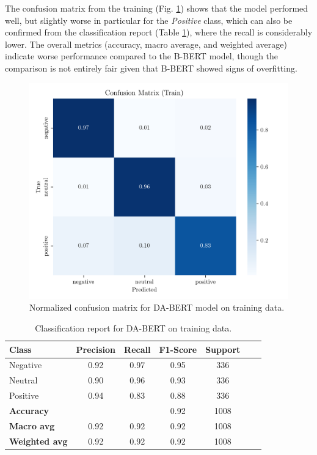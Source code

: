 \documentclass[conference]{IEEEtran}
\begin{document}
The confusion matrix from the training (Fig. \ref{fig:dataaugmented_bert_confusion_matrix_Train}) shows that the model performed well, but slightly worse in particular for the \textit{Positive} class, which can also be confirmed from the classification report (Table \ref{cr_augmbert_train}), where the recall is considerably lower. The overall metrics (accuracy, macro average, and weighted average) indicate worse performance compared to the B-BERT model, though the comparison is not entirely fair given that B-BERT showed signs of overfitting.

\begin{figure}[H]
    \centering
    \includegraphics[width=1\linewidth]{assets/dataaugmented_bert_confusion_matrix_Train.png}
    \caption{Normalized confusion matrix for DA-BERT model on training data.}
    \label{fig:dataaugmented_bert_confusion_matrix_Train}
\end{figure}


\begin{table}[H]
\centering
\caption{Classification report for DA-BERT on training data.}
\label{cr_augmbert_train}
\begin{tabular}{lcccccc}
\toprule
\textbf{Class} & \textbf{Precision} & \textbf{Recall} & \textbf{F1-Score} & \textbf{Support} \\
\midrule
Negative & 0.92 & 0.97 & 0.95 & 336 \\
Neutral & 0.90 & 0.96 & 0.93 & 336 \\
Positive & 0.94 & 0.83 & 0.88 & 336 \\
\midrule
\textbf{Accuracy} &  &  & 0.92 & 1008 \\
\textbf{Macro avg} & 0.92 & 0.92 & 0.92 & 1008 \\
\textbf{Weighted avg} & 0.92 & 0.92 & 0.92 & 1008 \\
\bottomrule
\end{tabular}
\end{table}
\end{document}
